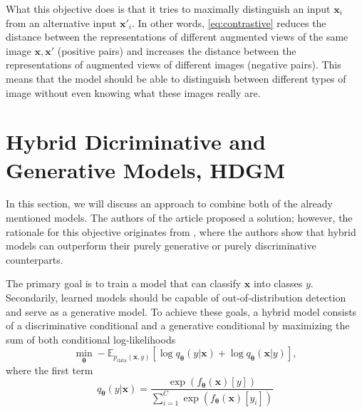 What this objective does is that it tries to maximally distinguish an input $\boldsymbol{x}_i$ from an alternative input $\boldsymbol{x}'_i$. In other words, \eqref{eq:contrastive} reduces the distance between the representations of different augmented views of the same image $\boldsymbol{x}, \boldsymbol{x}'$ (positive pairs) and increases the distance between the representations of augmented views of different images (negative pairs). This means that the model should be able to distinguish between different types of image without even knowing what these images really are. 



\section{Hybrid Dicriminative and Generative Models, HDGM}
In this section, we will discuss an approach to combine both of the already mentioned models.
The authors of the article \cite{HDGEmain} proposed a solution; however, the rationale for this objective originates from \cite{generativevsdisriminative}, where the authors show that hybrid models can outperform their purely generative or purely discriminative counterparts.

The primary goal is to train a model that can classify $\boldsymbol{x}$ into classes $y$. Secondarily, learned models should be capable of out-of-distribution detection and serve as a generative model. To achieve these goals, a hybrid model consists of a discriminative conditional and a generative conditional by maximizing the sum of both conditional log-likelihoods
\begin{equation}\label{q1q2}
	\min_{\boldsymbol{\theta}}- \mathbb{E}_{p_{\mathrm{data}}(\boldsymbol{x},y)}\left[\log q_{\boldsymbol{\theta}}\left(y|\boldsymbol{x}\right)+ \log q_{\boldsymbol{\theta}}\left(\boldsymbol{x}|y\right) \right],
\end{equation}
where the first term 
\begin{equation}
q_{\boldsymbol{\theta}}\left(y|\boldsymbol{x}\right) = \frac{\exp\left({f_{\boldsymbol{\theta}}\left(\boldsymbol{x}\right)[y]}\right)}{\sum_{i=1}^C\exp\left({f_{\boldsymbol{\theta}}\left(\boldsymbol{x}\right)[y_i]}\right)}
\end{equation}

